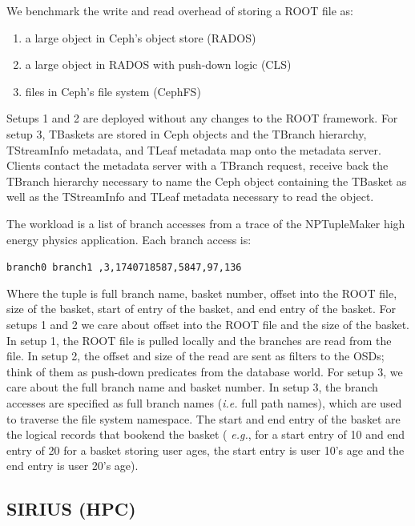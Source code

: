 We benchmark the write and read overhead of storing a ROOT file as:

\begin{enumerate}
  \item a large object in Ceph's object store (RADOS)
  \item a large object in RADOS with push-down logic (CLS)
  \item files in Ceph's file system (CephFS)
\end{enumerate}

Setups 1 and 2 are deployed without any changes to the ROOT framework. For
setup 3, TBaskets are stored in Ceph objects and the TBranch hierarchy,
TStreamInfo metadata, and TLeaf metadata map onto the metadata server.
Clients contact the metadata server with a TBranch request, receive back
the TBranch hierarchy necessary to name the Ceph object containing the TBasket
as well as the TStreamInfo and TLeaf metadata necessary to read the object. 

The workload is a list of branch accesses from a trace of the NPTupleMaker high
energy physics application. Each branch access is:

\noindent\texttt{branch0 branch1 ,3,1740718587,5847,97,136}

Where the tuple is full branch name, basket number, offset into the ROOT file,
size of the basket, start of entry of the basket, and end entry of the basket.
For setups 1 and 2 we care about offset into the ROOT file and the size of the
basket.  In setup 1, the ROOT file is pulled locally and the branches are read
from the file. In setup 2, the offset and size of the read are sent as filters
to the OSDs; think of them as push-down predicates from the database world.
For setup 3, we care about the full branch name and basket number.  In setup 3,
the branch accesses are specified as full branch names ({\it i.e.} full path
names), which are used to traverse the file system namespace. The start and end
entry of the basket are the logical records that bookend the basket ({\it
e.g.}, for a start entry of 10 and end entry of 20 for a basket storing user
ages, the start entry is user 10's age and the end entry is user 20's age).  

\subsection{SIRIUS (HPC)}
